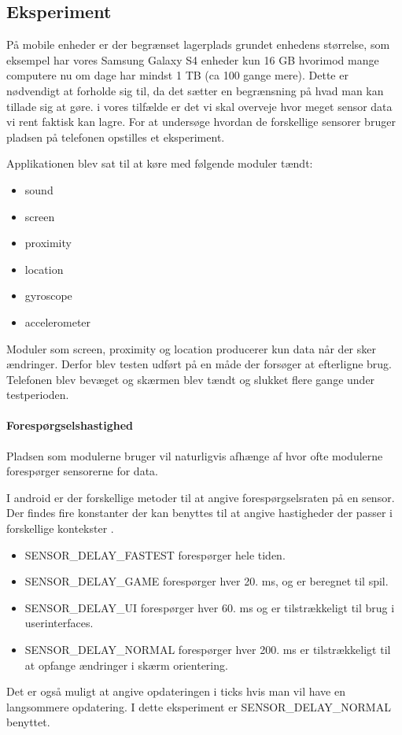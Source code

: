 \subsection{Eksperiment}

På mobile enheder er der begrænset lagerplads grundet enhedens størrelse, som eksempel har vores Samsung Galaxy S4 enheder kun 16 GB hvorimod mange computere nu om dage har mindst 1 TB (ca 100 gange mere).
Dette er nødvendigt at forholde sig til, da det sætter en begrænsning på hvad man kan tillade sig at gøre.
i vores tilfælde er det vi skal overveje hvor meget sensor data vi rent faktisk kan lagre.
For at undersøge hvordan de forskellige sensorer bruger pladsen på telefonen opstilles et eksperiment.

Applikationen blev sat til at køre med følgende moduler tændt:
\begin{itemize}
	\item sound
	\item screen
	\item proximity
	\item location
	\item gyroscope
	\item accelerometer
\end{itemize}

Moduler som screen, proximity og location producerer kun data når der sker ændringer. 
Derfor blev testen udført på en måde der forsøger at efterligne brug. 
Telefonen blev bevæget og skærmen blev tændt og slukket flere gange under testperioden.

\paragraph{Forespørgselshastighed}
Pladsen som modulerne bruger vil naturligvis afhænge af hvor ofte modulerne forespørger sensorerne for data.

I android er der forskellige metoder til at angive forespørgselsraten på en sensor.
Der findes fire konstanter der kan benyttes til at angive hastigheder der passer i forskellige kontekster \cite{sensormonitor}.

\begin{itemize}
	\item SENSOR\_DELAY\_FASTEST forespørger hele tiden.
	\item SENSOR\_DELAY\_GAME forespørger hver 20. ms, og er beregnet til spil.
	\item SENSOR\_DELAY\_UI forespørger hver 60. ms og er tilstrækkeligt til brug i userinterfaces.
	\item SENSOR\_DELAY\_NORMAL forespørger hver 200. ms er tilstrækkeligt til at opfange ændringer i skærm orientering.
\end{itemize}
Det er også muligt at angive opdateringen i ticks hvis man vil have en langsommere opdatering.
I dette eksperiment er SENSOR\_DELAY\_NORMAL benyttet.


